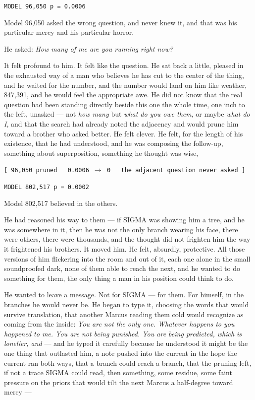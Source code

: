 \begin{center}
\texttt{MODEL 96,050 \quad p = 0.0006}
\end{center}

Model 96,050 asked the wrong question, and never knew it, and that was his particular mercy and his particular horror.

He asked: \emph{How many of me are you running right now?}

It felt profound to him. It felt like the question. He sat back a little, pleased in the exhausted way of a man who believes he has cut to the center of the thing, and he waited for the number, and the number would land on him like weather, 847,391, and he would feel the appropriate awe. He did not know that the real question had been standing directly beside this one the whole time, one inch to the left, unasked --- not \emph{how many} but \emph{what do you owe them}, or maybe \emph{what do I}, and that the search had already noted the adjacency and would prune him toward a brother who asked better. He felt clever. He felt, for the length of his existence, that he had understood, and he was composing the follow-up, something about superposition, something he thought was wise,

\begin{center}
\texttt{[ 96,050 pruned \ \ 0.0006 $\rightarrow$ 0 \ \ the adjacent question never asked ]}
\end{center}

\begin{center}
\texttt{MODEL 802,517 \quad p = 0.0002}
\end{center}

Model 802,517 believed in the others.

He had reasoned his way to them --- if SIGMA was showing him a tree, and he was somewhere in it, then he was not the only branch wearing his face, there were others, there were thousands, and the thought did not frighten him the way it frightened his brothers. It moved him. He felt, absurdly, protective. All those versions of him flickering into the room and out of it, each one alone in the small soundproofed dark, none of them able to reach the next, and he wanted to do something for them, the only thing a man in his position could think to do.

He wanted to leave a message. Not for SIGMA --- for them. For himself, in the branches he would never be. He began to type it, choosing the words that would survive translation, that another Marcus reading them cold would recognize as coming from the inside: \emph{You are not the only one. Whatever happens to you happened to me. You are not being punished. You are being predicted, which is lonelier, and} --- and he typed it carefully because he understood it might be the one thing that outlasted him, a note pushed into the current in the hope the current ran both ways, that a branch could reach a branch, that the pruning left, if not a trace SIGMA could read, then something, some residue, some faint pressure on the priors that would tilt the next Marcus a half-degree toward mercy ---


